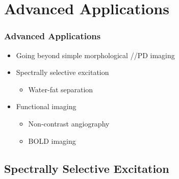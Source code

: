 


\section{Advanced Applications} %
\label{sec:advanced_applications}

\begin{frame}
	\frametitle{Advanced Applications}
	
	\begin{itemize}
		\item Going beyond simple morphological \longtime{}/\transtime{}/PD imaging
		\item Spectrally selective excitation
		\begin{itemize}
			\item Water-fat separation
		\end{itemize}
		\item Functional imaging
		\begin{itemize}
			\item Non-contrast angiography
			\item BOLD imaging
		\end{itemize}
	\end{itemize}
\end{frame}



\subsection{Spectrally Selective Excitation} %
\label{sub:spectrally_selective_excitation}

	
	
